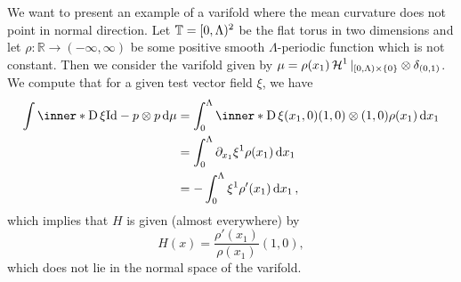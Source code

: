 \begin{example}
	\label{mean_curvature_vector_does_not_have_to_point_in_normal_direction}
	We want to present an example of a varifold where the mean curvature does 
	not point in normal direction.
	Let $ \operatorname{\mathbb{T}} = [ 0 , \Lambda )^{ 2 } $ be the flat torus in two 
	dimensions and let $ \rho \colon \mathbb{ R } \to (-\infty, \infty ) $ be 
	some positive smooth $\Lambda$-periodic function which is not constant. 
	Then we consider the varifold given by $ \mu = \rho ( x_{ 1 } ) \operatorname{\mathcal{H}}^{ 1 } 
	|_{ [ 0 , \Lambda ) \times \{ 0 \} } \otimes \delta_{ ( 0 , 1 ) } $. We 
	compute that for a given test vector field $ \xi $, we have
	\begin{align*}
		\int
			\inner*{ \diff \xi }{ \mathrm{Id} - p \otimes p }
		\dd{ \mu }
		& =
		\int_{ 0 }^{ \Lambda }
			\inner*{ \diff \xi ( x_{ 1 } , 0 ) }{ ( 1, 0 ) \otimes ( 1, 0 ) }
			\rho ( x_{ 1 } )
		\dd{ x_{ 1 } }
		\\
		& = 
		\int_{ 0 }^{ \Lambda }
			\partial_{ x_{ 1 } } \xi^{ 1 } \rho ( x_{ 1 } )
		\dd{ x_{ 1 } }
		\\
		& =
		-
		\int_{ 0 }^{ \Lambda }
			\xi^{ 1 }
			\rho' ( x_{ 1 } )
		\dd{ x_{ 1 } },
	\end{align*}
	which implies that $ H $ is given (almost everywhere) by 
	\begin{equation*}
		H ( x ) = \frac{ \rho' ( x_{ 1 } ) }{ \rho ( x_{ 1 } ) } ( 1 , 0 ),
	\end{equation*}
	which does not lie in the normal space of the varifold.
\end{example}